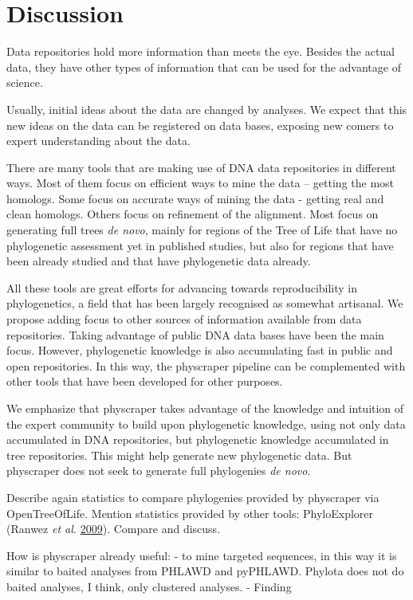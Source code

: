 \documentclass[]{article}
\begin{document}
\hypertarget{discussion}{%
\section{Discussion}\label{discussion}}

Data repositories hold more information than meets the eye.
Besides the actual data, they have other types of information that can be used for the advantage of science.

Usually, initial ideas about the data are changed by analyses.
We expect that this new ideas on the data can be registered on data bases,
exposing new comers to expert understanding about the data.

There are many tools that are making use of DNA data repositories in different ways.
Most of them focus on efficient ways to mine the data -- getting the most homologs.
Some focus on accurate ways of mining the data - getting real and clean homologs.
Others focus on refinement of the alignment.
Most focus on generating full trees \emph{de novo}, mainly for regions of the Tree of
Life that have no phylogenetic assessment yet in published studies, but also for
regions that have been already studied and that have phylogenetic data already.

All these tools are great efforts for advancing towards reproducibility in phylogenetics,
a field that has been largely recognised as somewhat artisanal.
We propose adding focus to other sources of information available from data repositories.
Taking advantage of public DNA data bases have been the main focus. However, phylogenetic knowledge is
also accumulating fast in public and open repositories.
In this way, the physcraper pipeline can be complemented with other tools that have
been developed for other purposes.

We emphasize that physcraper takes advantage of the knowledge and intuition of the expert
community to build upon phylogenetic knowledge, using not only data accumulated in
DNA repositories, but phylogenetic knowledge accumulated in tree repositories.
This might help generate new phylogenetic data. But physcraper does not seek to generate full phylogenies \emph{de novo}.

Describe again statistics to compare phylogenies provided by physcraper via OpenTreeOfLife.
Mention statistics provided by other tools: PhyloExplorer (Ranwez \emph{et al.} \protect\hyperlink{ref-ranwez2009phyloexplorer}{2009}).
Compare and discuss.

How is physcraper already useful:
- to mine targeted sequences, in this way it is similar to baited analyses from PHLAWD and pyPHLAWD. Phylota does not do baited analyses, I think, only clustered analyses.
- Finding
\end{document}
